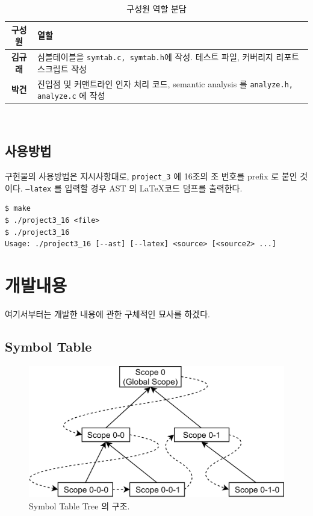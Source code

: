 \documentclass[a4paper, 12p]{paper}
\def\code#1{\texttt{#1}}
\begin{document}
\begin{table}[H]
  \centering
\begin{threeparttable}
  \caption{구성원 역할 분담}\label{table:slave}
\begin{tabular}{cl}
  \toprule
구성원 &  열할 \\
        \midrule
  \textbf{김규래}  & 심볼테이블을 \code{symtab.c, symtab.h}에 작성. 테스트 파일, 커버리지 리포트 스크립트 작성 \\
  \textbf{박건}   & 진입점 및 커맨트라인 인자 처리 코드, semantic analysis 를 \code{analyze.h, analyze.c} 에 작성 \\
 \bottomrule
\end{tabular}
\end{threeparttable}\\
\end{table}

\subsection{사용방법}
구현물의 사용방법은 지시사항대로, \code{project\_3} 에 16조의 조 번호를 prefix 로 붙인 것이다. \code{--latex} 를 입력할 경우 AST 의 \LaTeX 코드 덤프를 출력한다.

\begin{verbatim}
$ make
$ ./project3_16 <file>
$ ./project3_16
Usage: ./project3_16 [--ast] [--latex] <source> [<source2> ...]
\end{verbatim}

\section{개발내용}
여기서부터는 개발한 내용에 관한 구체적인 묘사를 하겠다.

\subsection{Symbol Table}

\begin{figure}[ht]
  \centering
\includegraphics[scale=0.15]{figs/symtabtree.png}
\caption{Symbol Table Tree 의 구조.}\label{fig:symtabtree}
\end{figure}
\end{document}
